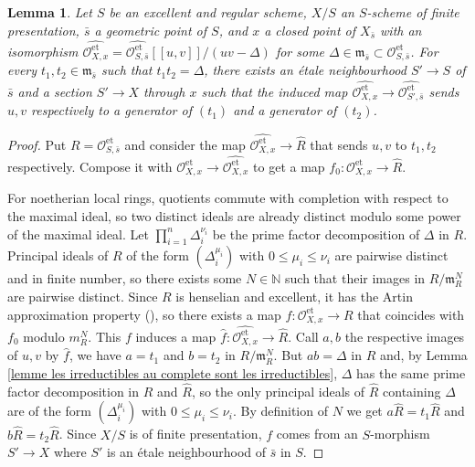 \documentclass[a4paper,10pt,twoside]{article}
\newcommand{\ra}{\rightarrow}
\newcommand{\on}[1]{\operatorname{#1}}
\renewcommand{\O}{\mathcal{O}}
\newcommand{\N}{\mathbb{N}}
\newcommand{\m}{\mathfrak{m}}
\newtheorem{lem}[thm]{Lemma}
\theoremstyle{definition}
\theoremstyle{remark}
\renewcommand{\on}[1]{\operatorname{#1}}
\begin{document}
\begin{lem}\label{lemme existence des sections avant completion pour raffinements asymetriques}
Let $S$ be an excellent and regular scheme, $X/S$ an $S$-scheme of finite presentation, $\bar s$ a geometric point of $S$, and $x$ a closed point of $X_{\bar s}$ with an isomorphism $\widehat{\O_{X,x}^{\on{et}}}=\widehat{\O_{S,\bar s}^{\on{et}}}[[u,v]]/(uv-\Delta)$ for some $\Delta\in\m_{\bar s}\subset \O_{S,{\bar s}}^{\on{et}}$. For every $t_1,t_2\in \m_{\bar s}$ such that $t_1t_2=\Delta$, there exists an \'etale neighbourhood $S' \to S$ of ${\bar s}$ and a section $S' \to X$ through $x$ such that the induced map $\widehat{\O_{X,x}^{\on{et}}}\ra\widehat{\O_{S',{\bar s}}^{\on{et}}}$ sends $u,v$ respectively to a generator of $(t_1)$ and a generator of $(t_2)$.
\end{lem}

\begin{proof}
Put $R=\O_{S,{\bar s}}^{\on{et}}$ and consider the map $\widehat{\O_{X,x}^{\on{et}}}\ra\widehat{R}$ that sends $u,v$ to $t_1,t_2$ respectively. Compose it with $\O_{X,x}^{\on{et}}\ra\widehat{\O_{X,x}^{\on{et}}}$ to get a map $f_0:\O_{X,x}^{\on{et}}\ra\widehat{R}$.

For noetherian local rings, quotients commute with completion with respect to the maximal ideal, so two distinct ideals are already distinct modulo some power of the maximal ideal. Let $\prod\limits_{i=1}^n\Delta_i^{\nu_i}$ be the prime factor decomposition of $\Delta$ in $R$. Principal ideals of $R$ of the form $(\Delta_i^{\mu_i})$ with $0\leq\mu_i\leq\nu_i$ are pairwise distinct and in finite number, so there exists some $N\in\N$ such that their images in $R/\m_R^N$ are pairwise distinct. Since $R$ is henselian and excellent, it has the Artin approximation property (\cite[\href{https://stacks.math.columbia.edu/tag/07QY}{Tag 07QY}]{stacks-project}), so there exists a map $f\colon\O_{X,x}^{\on{et}}\ra R$ that coincides with $f_0$ modulo $m_R^N$. This $f$ induces a map $\widehat{f}:\widehat{\O_{X,x}^{\on{et}}}\ra\widehat{R}$. Call $a,b$ the respective images of $u,v$ by $\widehat{f}$, we have $a=t_1$ and $b=t_2$ in $R/\m_R^N$. But $ab=\Delta$ in $\widehat{R}$ and, by Lemma \ref{lemme les irreductibles au complete sont les irreductibles}, $\Delta$ has the same prime factor decomposition in $R$ and $\widehat{R}$, so the only principal ideals of $\widehat{R}$ containing $\Delta$ are of the form $(\Delta_i^{\mu_i})$ with $0\leq\mu_i\leq\nu_i$. By definition of $N$ we get $a\widehat{R}=t_1\widehat{R}$ and $b\widehat{R}=t_2\widehat{R}$. Since $X/S$ is of finite presentation, $f$ comes from an $S$-morphism $S' \to X$ where $S'$ is an \'etale neighbourhood of ${\bar s}$ in $S$.
\end{proof}
\end{document}
